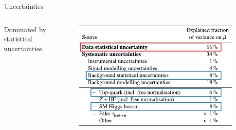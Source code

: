 \documentclass[11pt, xcolor={dvipsnames}, aspectratio=169]{beamer}
\begin{document}
\begin{frame}{Uncertainties}
  \begin{columns}[onlytextwidth]

    Dominated by statistical uncertainties

    \centering

    {}

    \vspace*{1.0em}

    \includegraphics[width=0.9\textwidth]{uncertainty_table}
  \end{columns}


\end{frame}

\end{document}
